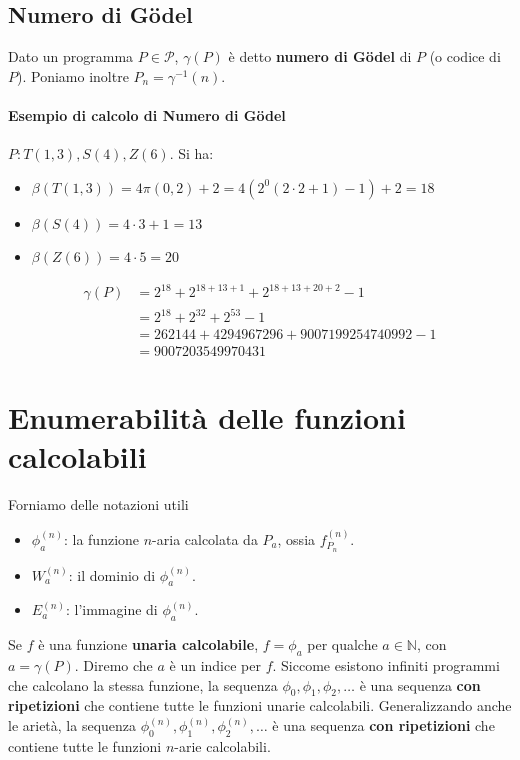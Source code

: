 	\subsection{Numero di Gödel}
	
	Dato un programma $P \in \mathcal P$, $\gamma(P)$ è detto \textbf{numero di   Gödel} di $P$ (o codice di $P$). Poniamo inoltre $P_n = \gamma^{-1}(n)$.
	
	
	\paragraph{Esempio di calcolo di Numero di Gödel}
	
	$P : T(1,3), S(4), Z(6)$. Si ha:
	\begin{itemize}
		\item $\beta(T(1,3)) = 4\pi(0,2) + 2 = 4(2^0(2\cdot 2 + 1) -1) + 2 = 18$
		\item $\beta(S(4)) = 4\cdot3+1 = 13$
		\item $\beta(Z(6)) = 4\cdot5 = 20$
	\end{itemize}
	$$
	\begin{aligned}
	\gamma(P) &= 2^{18} + 2^{18+13+1} + 2^{18+13+20+2} - 1\\
	&= 2^{18} + 2^{32} + 2^{53} - 1\\
	&= 262144 + 4294967296 + 9007199254740992 - 1\\
	&= 9007203549970431
\end{aligned}
	$$
	
	
	
	
	\section{Enumerabilità delle funzioni calcolabili}
	
	Forniamo delle notazioni utili
	\begin{itemize}
		\item $\phi_a^{(n)}$: la funzione $n$-aria calcolata da $P_a$, ossia $f_{P_n}^{(n)}$.
		\item $W_a^{(n)}$: il dominio di $\phi_a^{(n)}$.
		\item $E_a^{(n)}$: l'immagine di  $\phi_a^{(n)}$.
	\end{itemize}
	
	Se $f$ è una funzione \textbf{unaria calcolabile}, $f = \phi_a$ per qualche $a \in \mathbb{N}$, con $a = \gamma(P)$. Diremo che $a$ è un indice per $f$. Siccome esistono infiniti programmi che calcolano la stessa funzione, la sequenza $\phi_0, \phi_1, \phi_2, \dots$ è una sequenza \textbf{con ripetizioni} che contiene tutte le funzioni unarie calcolabili. Generalizzando anche le arietà, la sequenza $\phi_0^{(n)}, \phi_1^{(n)}, \phi_2^{(n)}, \dots$ è una sequenza \textbf{con ripetizioni} che contiene tutte le funzioni $n$-arie calcolabili.
	
